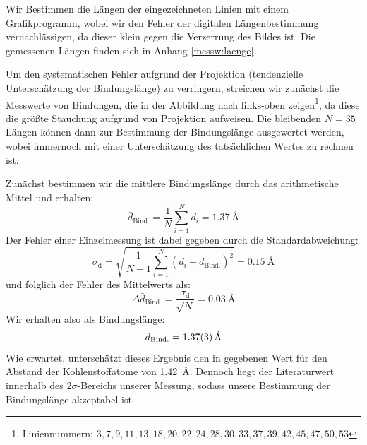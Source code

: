 \documentclass[10pt, a4paper]{article}
\begin{document}
Wir Bestimmen die Längen der eingezeichneten Linien mit einem Grafikprogramm, wobei wir den Fehler der digitalen Längenbestimmung vernachlässigen, da dieser klein gegen die Verzerrung des Bildes ist.
Die gemessenen Längen finden sich in Anhang \ref{messw:laenge}.

Um den systematischen Fehler aufgrund der Projektion (tendenzielle Unterschätzung der Bindungslänge) zu verringern, streichen wir zunächst die Messwerte von Bindungen, die in der Abbildung nach links-oben zeigen\footnote{Liniennummern: $3,7,9,11,13,18,20,22,24,28,30,33,37,39,42,45,47,50,53$}, da diese die größte Stauchung aufgrund von Projektion aufweisen.
Die bleibenden $N = \num{35}$ Längen können dann zur Bestimmung der Bindungslänge ausgewertet werden, wobei immernoch mit einer Unterschätzung des tatsächlichen Wertes zu rechnen ist.

Zunächst bestimmen wir die mittlere Bindungslänge durch das arithmetische Mittel und erhalten:
\begin{equation}
  \bar{d}_\mathrm{Bind.} = \frac{1}{N} \sum_{i=1}^N d_i= \SI{1,37}{\angstrom}
\end{equation}
Der Fehler einer Einzelmessung ist dabei gegeben durch die Standardabweichung:
\begin{equation}
  \sigma_\mathrm{d} = \sqrt{\frac{1}{N-1} \sum_{i=1}^N (d_i - \bar{d}_\mathrm{Bind.})^2} = \SI{0,15}{\angstrom}
\end{equation}
und folglich der Fehler des Mittelwerts als:
\begin{equation}
  \Delta \bar{d}_\mathrm{Bind.} = \frac{\sigma_\mathrm{d}}{\sqrt{N}} = \SI{0,03}{\angstrom}
\end{equation}
Wir erhalten also als Bindungslänge:
\begin{equation*}
  d_\mathrm{Bind.} = \SI{1,37 +- 0,03}{\angstrom}
\end{equation*}
Wie erwartet, unterschätzt dieses Ergebnis den in \cite{colton} gegebenen Wert für den Abstand der Kohlenstoffatome von \SI{1,42}{\angstrom}. Dennoch liegt der Literaturwert innerhalb des $2\sigma$-Bereichs unserer Messung, sodass unsere Bestimmung der Bindungslänge akzeptabel ist.
\end{document}
